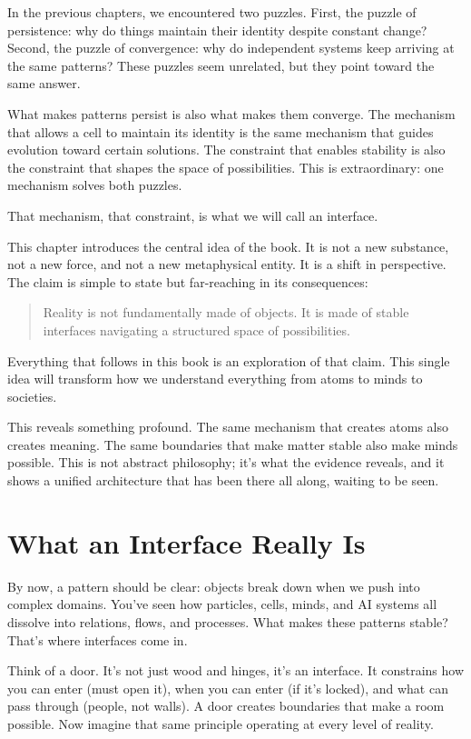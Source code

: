 \documentclass[
  openright]{book}
\begin{document}
In the previous chapters, we encountered two puzzles. First, the puzzle
of persistence: why do things maintain their identity despite constant
change? Second, the puzzle of convergence: why do independent systems
keep arriving at the same patterns? These puzzles seem unrelated, but
they point toward the same answer.

What makes patterns persist is also what makes them converge. The
mechanism that allows a cell to maintain its identity is the same
mechanism that guides evolution toward certain solutions. The constraint
that enables stability is also the constraint that shapes the space of
possibilities. This is extraordinary: one mechanism solves both puzzles.

That mechanism, that constraint, is what we will call an
interface.

This chapter introduces the central idea of the book. It is not a new
substance, not a new force, and not a new metaphysical entity. It is a
shift in perspective. The claim is simple to state but far-reaching in
its consequences:

\begin{quote}
Reality is not fundamentally made of objects. It is made of stable
interfaces navigating a structured space of possibilities.
\end{quote}

Everything that follows in this book is an exploration of that claim.
This single idea will transform how we understand everything from atoms
to minds to societies.

This reveals something profound. The same mechanism that creates atoms
also creates meaning. The same boundaries that make matter stable also
make minds possible. This is not abstract philosophy; it's what the
evidence reveals, and it shows a unified architecture that has been
there all along, waiting to be seen.

\section{What an Interface Really Is}\label{what-an-interface-really-is}

By now, a pattern should be clear: objects break down when we push into
complex domains. You've seen how particles, cells, minds, and AI systems
all dissolve into relations, flows, and processes. What makes these
patterns stable? That's where interfaces come in.

Think of a door. It's not just wood and hinges, it's an interface. It
constrains how you can enter (must open it), when you can enter (if it's
locked), and what can pass through (people, not walls). A door creates
boundaries that make a room possible. Now imagine that same principle
operating at every level of reality.
\end{document}

